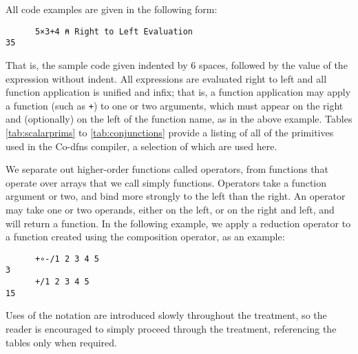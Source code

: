 \documentclass[numbers,preprint]{sigplanconf}
\begin{document}
All code examples are given in the following form:

\begin{verbatim}
      5×3+4 ⍝ Right to Left Evaluation
35
\end{verbatim}

That is, the sample code given indented by 6 spaces, followed by the value 
of the expression without indent. All expressions are evaluated right to 
left and all function application is unified and infix; that is, a function 
application may apply a function (such as \verb;+;) to one or two arguments, 
which must appear on the right and (optionally) on the left of the function 
name, as in the above example. Tables \ref{tab:scalarprims} to 
\ref{tab:conjunctions}
provide a listing of all of the primitives used in the Co-dfns compiler, 
a selection of which are used here. 

We separate out higher-order functions called operators, from functions that 
operate over arrays that we call simply functions. Operators take a function 
argument or two, and bind more strongly to the left than the right. An 
operator may take one or two operands, either on the left, or on the 
right and left, and will return a function. In the following 
example, we apply a reduction operator to a function created using the 
composition operator, as an example:

\begin{verbatim}
      +∘-/1 2 3 4 5
3
      +/1 2 3 4 5
15
\end{verbatim}

Uses of the notation are introduced slowly throughout the treatment, so 
the reader is encouraged to simply proceed through the treatment, referencing 
the tables only when required. 
\end{document}
